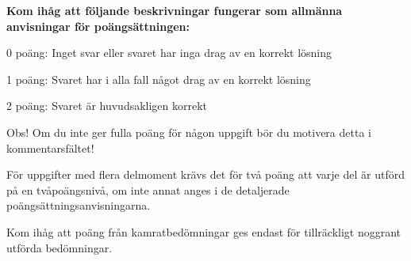 \documentclass[11pt,a4paper,oneside,notitlepage,final]{article}
\begin{document}
{\bf Kom ihåg att följande beskrivningar fungerar som allmänna anvisningar för poängsättningen:

0 poäng: Inget svar eller svaret har inga drag av en korrekt lösning

1 poäng: Svaret har i alla fall något drag av en korrekt lösning

2 poäng: Svaret är huvudsakligen korrekt

Obs! Om du inte ger fulla poäng för någon uppgift bör du motivera detta i kommentarsfältet!


För uppgifter med flera delmoment krävs det för två poäng att varje del är utförd på en tvåpoängsnivå, om inte annat anges i de detaljerade poängsättningsanvisningarna.

Kom ihåg att poäng från kamratbedömningar ges endast för tillräckligt noggrant utförda bedömningar.}
\end{document}
